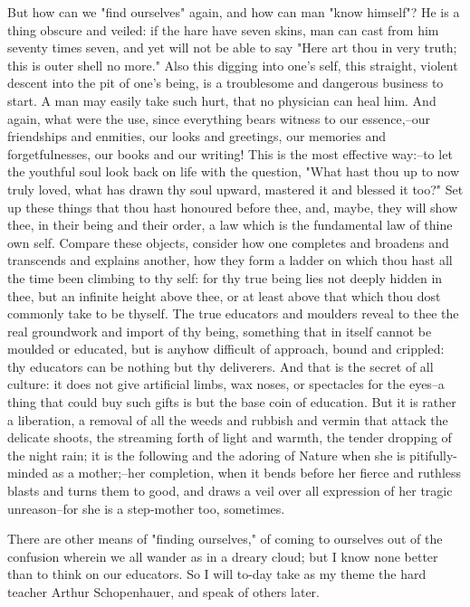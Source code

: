 But how can we "find ourselves" again, and how can man "know
himself"? He is a thing obscure and veiled: if the hare have seven
skins, man can cast from him seventy times seven, and yet will not be
able to say "Here art thou in very truth; this is outer shell no
more." Also this digging into one's self, this straight, violent
descent into the pit of one's being, is a troublesome and dangerous
business to start. A man may easily take such hurt, that no physician
can heal him. And again, what were the use, since everything bears
witness to our essence,--our friendships and enmities, our looks and
greetings, our memories and forgetfulnesses, our books and our
writing! This is the most effective way:--to let the youthful soul
look back on life with the question, "What hast thou up to now truly
loved, what has drawn thy soul upward, mastered it and blessed it
too?" Set up these things that thou hast honoured before thee, and,
maybe, they will show thee, in their being and their order, a law
which is the fundamental law of thine own self. Compare these
objects, consider how one completes and broadens and transcends and
explains another, how they form a ladder on which thou hast all the
time been climbing to thy self: for thy true being lies not deeply
hidden in thee, but an infinite height above thee, or at least above
that which thou dost commonly take to be thyself. The true educators
and moulders reveal to thee the real groundwork and import of thy
being, something that in itself cannot be moulded or educated, but is
anyhow difficult of approach, bound and crippled: thy educators can
be nothing but thy deliverers. And that is the secret of all culture:
it does not give artificial limbs, wax noses, or spectacles for the
eyes--a thing that could buy such gifts is but the base coin of
education. But it is rather a liberation, a removal of all the
weeds and rubbish and vermin that attack the delicate shoots, the
streaming forth of light and warmth, the tender dropping of the night
rain; it is the following and the adoring of Nature when she is
pitifully-minded as a mother;--her completion, when it bends before
her fierce and ruthless blasts and turns them to good, and draws
a veil over all expression of her tragic unreason--for she is a
step-mother too, sometimes.

There are other means of "finding ourselves," of coming to ourselves
out of the confusion wherein we all wander as in a dreary cloud; but
I know none better than to think on our educators. So I will to-day
take as my theme the hard teacher Arthur Schopenhauer, and speak of
others later.


